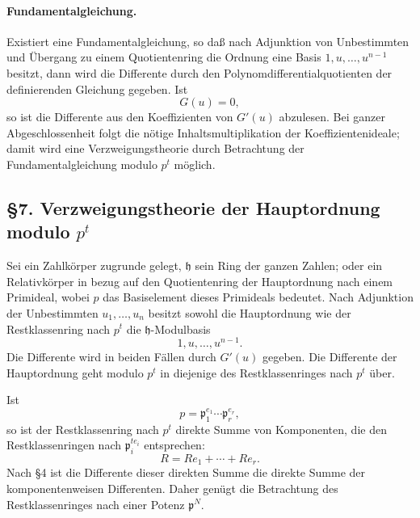 \documentclass[11pt]{article}
\begin{document}
\paragraph{Fundamentalgleichung.}
Existiert eine Fundamentalgleichung, so daß nach Adjunktion von Unbestimmten und Übergang zu einem Quotientenring die Ordnung eine Basis $1,u,\ldots,u^{n-1}$ besitzt, dann wird die Differente durch den Polynomdifferentialquotienten der definierenden Gleichung gegeben. Ist
\[
        G(u)=0,
\]
so ist die Differente aus den Koeffizienten von $G'(u)$ abzulesen. Bei ganzer Abgeschlossenheit folgt die nötige Inhaltsmultiplikation der Koeffizientenideale; damit wird eine Verzweigungstheorie durch Betrachtung der Fundamentalgleichung modulo $p^t$ möglich.

\subsection*{§7. Verzweigungstheorie der Hauptordnung modulo $p^t$}

Sei ein Zahlkörper zugrunde gelegt, $\mathfrak h$ sein Ring der ganzen Zahlen; oder ein Relativkörper in bezug auf den Quotientenring der Hauptordnung nach einem Primideal, wobei $p$ das Basiselement dieses Primideals bedeutet. Nach Adjunktion der Unbestimmten $u_1,\ldots,u_n$ besitzt sowohl die Hauptordnung wie der Restklassenring nach $p^t$ die $\mathfrak h$-Modulbasis
\[
        1,u,\ldots,u^{n-1}.
\]
Die Differente wird in beiden Fällen durch $G'(u)$ gegeben. Die Differente der Hauptordnung geht modulo $p^t$ in diejenige des Restklassenringes nach $p^t$ über.

Ist
\[
        p=\mathfrak p_1^{e_1}
        \cdots\mathfrak p_r^{e_r},
\]
so ist der Restklassenring nach $p^t$ direkte Summe von Komponenten, die den Restklassenringen nach $\mathfrak p_i^{te_i}$ entsprechen:
\[
        R=Re_1+
        \cdots+Re_r.
\]
Nach §4 ist die Differente dieser direkten Summe die direkte Summe der komponentenweisen Differenten. Daher genügt die Betrachtung des Restklassenringes nach einer Potenz $\mathfrak p^N$.
\end{document}
